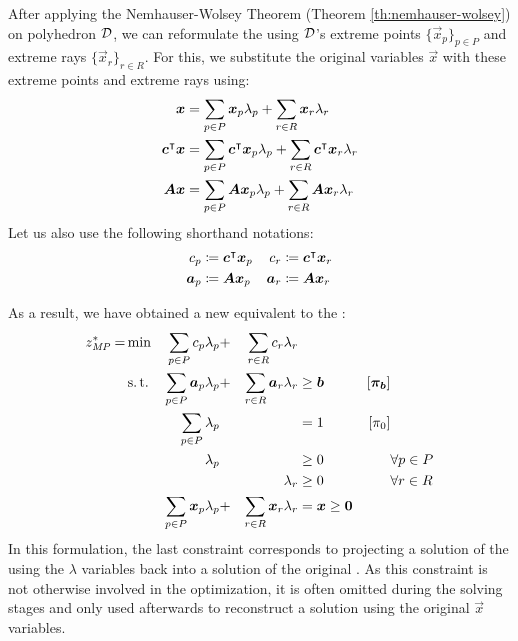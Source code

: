 After applying the Nemhauser-Wolsey Theorem (Theorem \ref{th:nemhauser-wolsey}) on polyhedron $\mathcal{D}$, we can reformulate the \LP{} using $\mathcal{D}$'s extreme points $\{\vec{x}_p\}_{p \in P}$ and extreme rays $\{\vec{x}_r\}_{r \in R}$. For this, we substitute the original variables $\vec{x}$ with these extreme points and extreme rays using:
\begin{equation}
\begin{aligned}
{\bm{x}} &= \sum_{p \in P} {\bm{x}}_p \lambda_p + \sum_{r \in R} {\bm{x}}_r \lambda_r \\
{\bm{c}}^\intercal {\bm{x}} &= \sum_{p \in P} {\bm{c}}^\intercal {\bm{x}}_p \lambda_p + \sum_{r \in R} {\bm{c}}^\intercal {\bm{x}}_r \lambda_r \\
{\bm{A}} {\bm{x}} &= \sum_{p \in P} {\bm{A}} {\bm{x}}_p \lambda_p + \sum_{r \in R} {\bm{A}} {\bm{x}}_r \lambda_r
\end{aligned}
\end{equation}
Let us also use the following shorthand notations:
\begin{equation}
\begin{aligned}
c_p &\coloneqq {\bm{c}}^\intercal {\bm{x}}_p
&c_r &\coloneqq {\bm{c}}^\intercal {\bm{x}}_r \\
{\bm{a}}_p &\coloneqq {\bm{A}} {\bm{x}}_p
&{\bm{a}}_r &\coloneqq {\bm{A}} {\bm{x}}_r
\end{aligned}
\end{equation}

As a result, we have obtained a new \MP{} equivalent to the \LP{}:
\begin{equation}
\begin{aligned}
z^*_{\textit{MP}}{} = &\min & \sum_{p \in P} c_p \lambda_p &+ &\sum_{r \in R} c_r \lambda_r & & & \\
&\operatorname{s.t.} & \sum_{p \in P} {\bm{a}}_p \lambda_p &+ &\sum_{r \in R} {\bm{a}}_r \lambda_r & \geq {\bm{b}} & \left[{\bm{\pi}}_{\bm{b}}\right] \\
&& \sum_{p \in P} \lambda_p & & & = 1 & \left[\pi_0 \right] & \\
&& \lambda_p & & & \geq 0 & & \forall p \in P \\
&& & & \lambda_r & \geq 0 & & \forall r \in R \\
&& \sum_{p \in P} {\bm{x}}_p \lambda_p &+ &\sum_{r \in R} {\bm{x}}_r \lambda_r & = {\bm{x}} \geq {\bm{0}} & &
\end{aligned}
\end{equation}
In this formulation, the last constraint corresponds to projecting a solution of the \MP{} using the $\lambda$ variables back into a solution of the original \LP{}. As this constraint is not otherwise involved in the optimization, it is often omitted during the solving stages and only used afterwards to reconstruct a solution using the original $\vec{x}$ variables.

